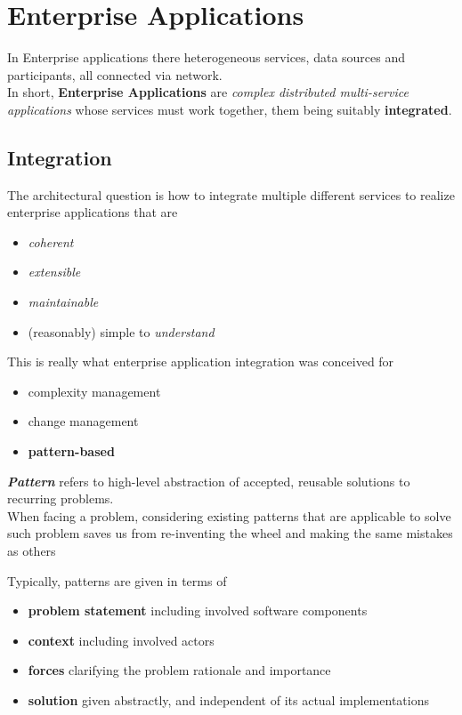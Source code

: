 \chapter{Enterprise Applications}
In Enterprise applications there heterogeneous services, data sources and participants, all connected via network.\\
In short, \textbf{Enterprise Applications} are \textit{complex distributed multi-service applications} whose services must work together, them being suitably \textbf{integrated}.

\section{Integration}
The architectural question is how to integrate multiple different services to realize enterprise applications that are
\begin{itemize}
   \item \textit{coherent}
   \item \textit{extensible}
   \item \textit{maintainable}
   \item (reasonably) simple to \textit{understand}
\end{itemize}

This is really what enterprise application integration was conceived for
\begin{itemize}
   \item complexity management
   \item change management
   \item \textbf{pattern-based}
\end{itemize}

\textbf{\textit{Pattern}} refers to high-level abstraction of accepted, reusable solutions to recurring problems.\\
When facing a problem, considering existing patterns that are applicable to
solve such problem saves us from re-inventing the wheel and making
the same mistakes as others

Typically, patterns are given in terms of
\begin{itemize}   
   \item \textbf{problem statement}
   including involved software components
   \item \textbf{context}
   including involved actors
   \item \textbf{forces}
   clarifying the problem rationale and importance
   \item \textbf{solution}
   given abstractly, and independent of its actual implementations
\end{itemize}


